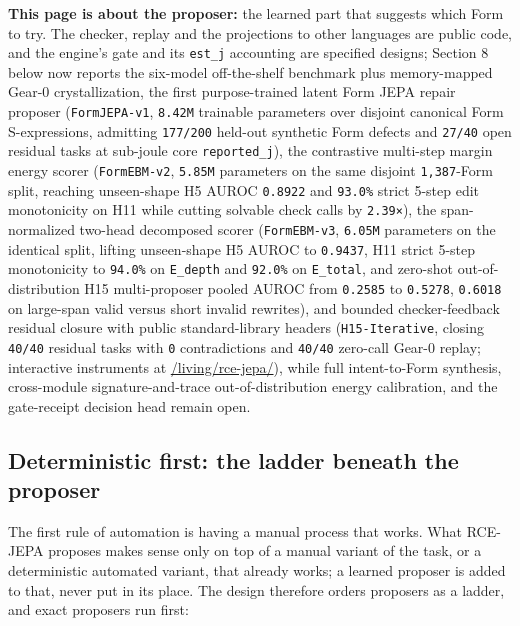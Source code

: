 \documentclass[10pt,letterpaper]{article}
\begin{document}
\textbf{This page is about the proposer:} the learned part that suggests
which Form to try. The checker, replay and the projections to other
languages are public code, and the engine's gate and its \texttt{est\_j}
accounting are specified designs; Section 8 below now reports the
six-model off-the-shelf benchmark plus memory-mapped Gear-0
crystallization, the first purpose-trained latent Form JEPA repair
proposer (\texttt{FormJEPA-\allowbreak{}v1}, \texttt{8.42M} trainable parameters over
disjoint canonical Form S-expressions, admitting \texttt{177/200}
held-out synthetic Form defects and \texttt{27/40} open residual tasks
at sub-joule core \texttt{reported\_\allowbreak{}j}), the contrastive multi-step
margin energy scorer (\texttt{FormEBM-\allowbreak{}v2}, \texttt{5.85M} parameters on
the same disjoint \texttt{1,387}-Form split, reaching unseen-shape H5
AUROC \texttt{0.8922} and \texttt{93.0\%} strict 5-step edit
monotonicity on H11 while cutting solvable check calls by
\texttt{2.39×}), the span-normalized two-head decomposed scorer
(\texttt{FormEBM-\allowbreak{}v3}, \texttt{6.05M} parameters on the identical split,
lifting unseen-shape H5 AUROC to \texttt{0.9437}, H11 strict 5-step
monotonicity to \texttt{94.0\%} on \texttt{E\_depth} and \texttt{92.0\%}
on \texttt{E\_total}, and zero-shot out-of-distribution H15
multi-proposer pooled AUROC from \texttt{0.2585} to \texttt{0.5278},
\texttt{0.6018} on large-span valid versus short invalid rewrites), and
bounded checker-feedback residual closure with public standard-library
headers (\texttt{H15-\allowbreak{}Iterative}, closing \texttt{40/40} residual tasks
with \texttt{0} contradictions and \texttt{40/40} zero-call Gear-0
replay; interactive instruments at
\href{https://research.openie.dev/living/rce-jepa/}{/living/rce-jepa/}),
while full intent-to-Form synthesis, cross-module signature-and-trace
out-of-distribution energy calibration, and the gate-receipt decision
head remain open.

\subsection{Deterministic first: the ladder beneath the
proposer}\label{deterministic-first-the-ladder-beneath-the-proposer}

The first rule of automation is having a manual process that works. What
RCE-JEPA proposes makes sense only on top of a manual variant of the
task, or a deterministic automated variant, that already works; a
learned proposer is added to that, never put in its place. The design
therefore orders proposers as a ladder, and exact proposers run first:
\end{document}
